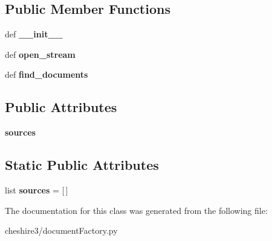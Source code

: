 \subsection*{Public Member Functions}
\begin{DoxyCompactItemize}
\item 
\hypertarget{classcheshire3_1_1document_factory_1_1_component_document_stream_a694ac0394b769dfa2088d7b626f1773e}{def {\bfseries \-\_\-\-\_\-init\-\_\-\-\_\-}}\label{classcheshire3_1_1document_factory_1_1_component_document_stream_a694ac0394b769dfa2088d7b626f1773e}

\item 
\hypertarget{classcheshire3_1_1document_factory_1_1_component_document_stream_ae2697788180c1af0a252e23c7f248962}{def {\bfseries open\-\_\-stream}}\label{classcheshire3_1_1document_factory_1_1_component_document_stream_ae2697788180c1af0a252e23c7f248962}

\item 
\hypertarget{classcheshire3_1_1document_factory_1_1_component_document_stream_a0da061cb2bf742da095167abe67e2589}{def {\bfseries find\-\_\-documents}}\label{classcheshire3_1_1document_factory_1_1_component_document_stream_a0da061cb2bf742da095167abe67e2589}

\end{DoxyCompactItemize}
\subsection*{Public Attributes}
\begin{DoxyCompactItemize}
\item 
\hypertarget{classcheshire3_1_1document_factory_1_1_component_document_stream_a9621346ca3f43e4fbc9582e5819e543d}{{\bfseries sources}}\label{classcheshire3_1_1document_factory_1_1_component_document_stream_a9621346ca3f43e4fbc9582e5819e543d}

\end{DoxyCompactItemize}
\subsection*{Static Public Attributes}
\begin{DoxyCompactItemize}
\item 
\hypertarget{classcheshire3_1_1document_factory_1_1_component_document_stream_a0fcd0303a7c577178d663e4bdd445c1c}{list {\bfseries sources} = \mbox{[}$\,$\mbox{]}}\label{classcheshire3_1_1document_factory_1_1_component_document_stream_a0fcd0303a7c577178d663e4bdd445c1c}

\end{DoxyCompactItemize}


The documentation for this class was generated from the following file\-:\begin{DoxyCompactItemize}
\item 
cheshire3/document\-Factory.\-py\end{DoxyCompactItemize}

